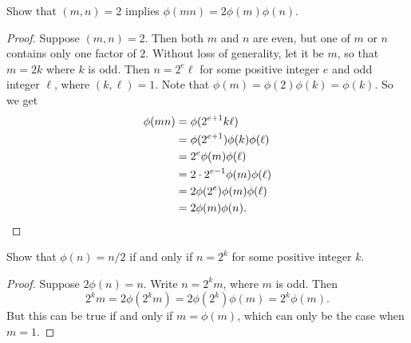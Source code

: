  Show that $(m,n) = 2$ implies $\phi(mn) = 2\phi(m)\phi(n)$.
\begin{proof}
  Suppose $(m,n) = 2$. Then both $m$ and $n$ are even, but one of $m$
  or $n$ contains only one factor of $2$. Without loss of generality,
  let it be $m$, so that $m = 2k$ where $k$ is odd. Then $n = 2^e\ell$
  for some positive integer $e$ and odd integer $\ell$, where
  $(k,\ell) = 1$. Note that $\phi(m) = \phi(2)\phi(k) = \phi(k)$. So
  we get
  \begin{align*}
    \phi(mn) &= \phi(2^{e+1}k\ell) \\
             &= \phi(2^{e+1})\phi(k)\phi(\ell) \\
             &= 2^e\phi(m)\phi(\ell) \\
             &= 2\cdot2^{e-1}\phi(m)\phi(\ell) \\
             &= 2\phi(2^e)\phi(m)\phi(\ell) \\
             &= 2\phi(m)\phi(n). \qedhere
  \end{align*}
\end{proof}

 Show that $\phi(n) = n/2$ if and only if $n = 2^k$ for
some positive integer $k$.
\begin{proof}
  Suppose $2\phi(n) = n$. Write $n = 2^km$, where $m$ is
  odd. Then
  \begin{equation*}
    2^km = 2\phi(2^km) = 2\phi(2^k)\phi(m) = 2^k\phi(m).
  \end{equation*}
  But this can be true if and only if $m = \phi(m)$, which can only be
  the case when $m = 1$.
\end{proof}
